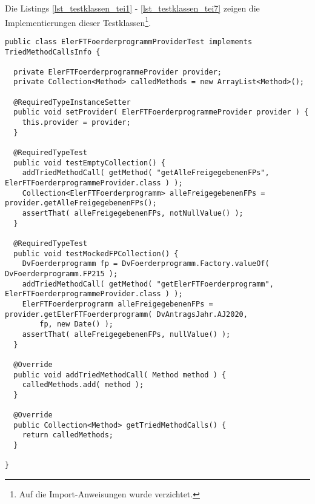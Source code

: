 Die Listings \ref{lst_testklassen_tei1} - \ref{lst_testklassen_tei7} zeigen die Implementierungen dieser Testklassen\footnote{Auf die Import-Anweisungen wurde verzichtet.}.
\begin{lstlisting}[style = java, caption = Interface ElerFTFoerderprogrammProviderTest, captionpos = b, label = lst_testklassen_tei1]
public class ElerFTFoerderprogrammProviderTest implements TriedMethodCallsInfo {

  private ElerFTFoerderprogrammeProvider provider;
  private Collection<Method> calledMethods = new ArrayList<Method>();
  
  @RequiredTypeInstanceSetter
  public void setProvider( ElerFTFoerderprogrammeProvider provider ) {
    this.provider = provider;
  }

  @RequiredTypeTest
  public void testEmptyCollection() {
    addTriedMethodCall( getMethod( "getAlleFreigegebenenFPs", ElerFTFoerderprogrammeProvider.class ) );
    Collection<ElerFTFoerderprogramm> alleFreigegebenenFPs = provider.getAlleFreigegebenenFPs();
    assertThat( alleFreigegebenenFPs, notNullValue() );
  }

  @RequiredTypeTest
  public void testMockedFPCollection() {
    DvFoerderprogramm fp = DvFoerderprogramm.Factory.valueOf( DvFoerderprogramm.FP215 );
    addTriedMethodCall( getMethod( "getElerFTFoerderprogramm", ElerFTFoerderprogrammeProvider.class ) );
    ElerFTFoerderprogramm alleFreigegebenenFPs = provider.getElerFTFoerderprogramm( DvAntragsJahr.AJ2020,
        fp, new Date() );
    assertThat( alleFreigegebenenFPs, nullValue() );
  }

  @Override
  public void addTriedMethodCall( Method method ) {
    calledMethods.add( method );
  }

  @Override
  public Collection<Method> getTriedMethodCalls() {
    return calledMethods;
  }

}
\end{lstlisting}
